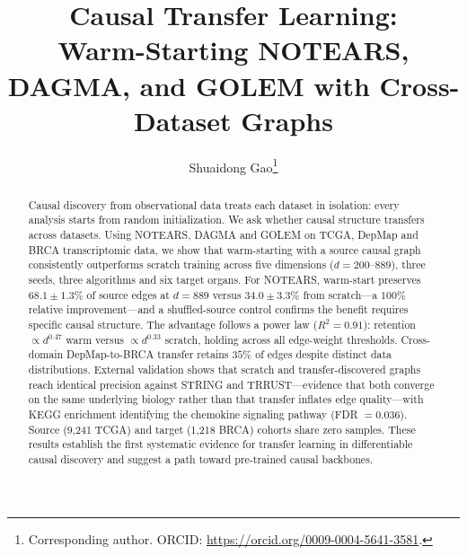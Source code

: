 \documentclass{ws-jbcb}
\begin{document}

\catchline{}{}{}{}{}

\title{Causal Transfer Learning:\\Warm-Starting NOTEARS, DAGMA, and GOLEM with Cross-Dataset Graphs}

\author{Shuaidong Gao\footnote{Corresponding author. ORCID: \url{https://orcid.org/0009-0004-5641-3581}.}}

\address{Chongqing Institute of Foreign Studies, Xuefu Road 1,\\
Qijiang District, Chongqing 401420, P.~R.~China\\
gaoshuaidong@stu.cqifs.edu.cn}

\maketitle

\begin{history}
\end{history}

\begin{abstract}
Causal discovery from observational data treats each dataset in isolation: every analysis starts from random initialization. We ask whether causal structure transfers across datasets. Using NOTEARS, DAGMA and GOLEM on TCGA, DepMap and BRCA transcriptomic data, we show that warm-starting with a source causal graph consistently outperforms scratch training across five dimensions ($d=200$--$889$), three seeds, three algorithms and six target organs. For NOTEARS, warm-start preserves $68.1\pm 1.3\%$ of source edges at $d=889$ versus $34.0\pm 3.3\%$ from scratch---a $100\%$ relative improvement---and a shuffled-source control confirms the benefit requires specific causal structure. The advantage follows a power law ($R^2=0.91$): retention $\propto d^{0.47}$ warm versus $\propto d^{0.33}$ scratch, holding across all edge-weight thresholds. Cross-domain DepMap-to-BRCA transfer retains $35\%$ of edges despite distinct data distributions. External validation shows that scratch and transfer-discovered graphs reach identical precision against STRING and TRRUST---evidence that both converge on the same underlying biology rather than that transfer inflates edge quality---with KEGG enrichment identifying the chemokine signaling pathway (FDR $=0.036$). Source (9,241 TCGA) and target (1,218 BRCA) cohorts share zero samples. These results establish the first systematic evidence for transfer learning in differentiable causal discovery and suggest a path toward pre-trained causal backbones.
\end{abstract}
\end{document}
